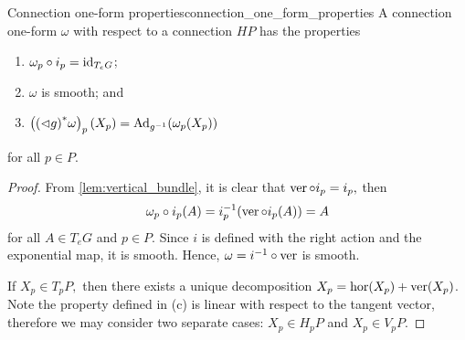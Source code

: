 \begin{theorem}{Connection one-form properties}{connection_one_form_properties}
    A connection one-form \(\omega\) with respect to a connection \(HP\) has the properties
    \begin{enumerate}[label=(\alph*)]
        \item \(\omega_p \circ i_p = \operatorname{id}_{T_eG}\);
        \item \(\omega\) is smooth; and
        \item \(\left({(\mathbin{\vartriangleleft} g)}^{\ast}_{}{\omega}\right)_p (X_p) = \operatorname{Ad}_{g^{-1}}(\omega_p (X_p))\)
    \end{enumerate}
    for all \(p \in P\).
\end{theorem}
\begin{proof}
    From \cref{lem:vertical_bundle}, it is clear that \(\operatorname{ver}\circ i_p = i_p,\) then
    \begin{equation*}
        \omega_p \circ i_p (A) = i^{-1}_p(\operatorname{ver} \circ i_p(A)) = A
    \end{equation*}
    for all \(A \in T_eG\) and \(p \in P\). Since \(i\) is defined with the right action and the exponential map, it is smooth. Hence, \(\omega = i^{-1} \circ \operatorname{ver}\) is smooth.

    If \(X_p \in T_pP,\) then there exists a unique decomposition \(X_p = \operatorname{hor}(X_p) + \operatorname{ver}(X_p)\). Note the property defined in (c) is linear with respect to the tangent vector, therefore we may consider two separate cases: \(X_p \in H_pP\) and \(X_p \in V_pP\).


\end{proof}
